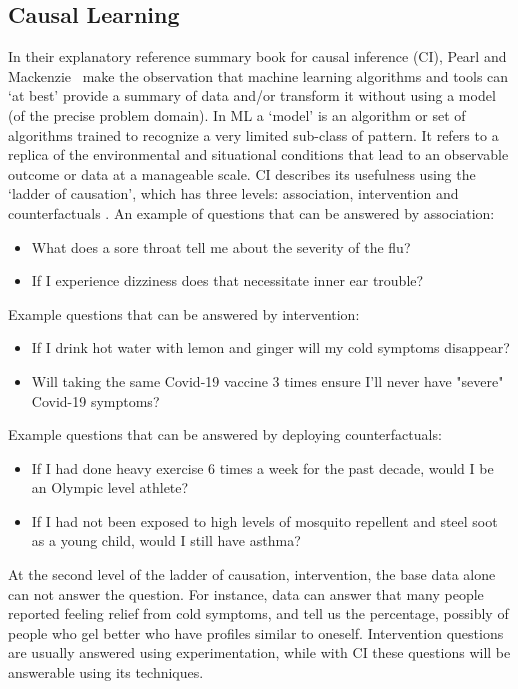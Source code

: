 \subsection{Causal Learning}
In their explanatory reference summary book for causal inference (CI), Pearl and Mackenzie~\cite{Pearl:2018} make the observation that machine learning algorithms and tools can `at best' provide a summary of data and/or transform it without using a model (of the precise problem domain).
In ML a `model' is an algorithm or set of algorithms trained to recognize a very limited sub-class of pattern.
It refers to a replica of the environmental and situational conditions that lead to an observable outcome or data at a manageable scale.
CI describes its usefulness using the `ladder of causation', which has three levels: association, intervention and counterfactuals \cite{Pearl:2018}.
An example of questions that can be answered by association:
\begin{itemize}
    \item What does a sore throat tell me about the severity of the flu?
    \item If I experience dizziness does that necessitate inner ear trouble?
\end{itemize}

Example questions that can be answered by intervention:
\begin{itemize}
    \item If I drink hot water with lemon and ginger will my cold symptoms disappear?
    \item Will taking the same Covid-19 vaccine 3 times ensure I'll never have "severe" Covid-19 symptoms?
\end{itemize}

Example questions that can be answered by deploying counterfactuals:
\begin{itemize}
    \item If I had done heavy exercise 6 times a week for the past decade, would I be an Olympic level athlete?
    \item If I had not been exposed to high levels of mosquito repellent and steel soot as a young child, would I still have asthma?
\end{itemize}

At the second level of the ladder of causation, intervention, the base data alone can not answer the question.
For instance, data can answer that many people reported feeling relief from cold symptoms, and tell us the percentage, possibly of people who gel better who have profiles similar to oneself.
Intervention questions are usually answered using experimentation, while with CI these questions will be answerable using its techniques.

